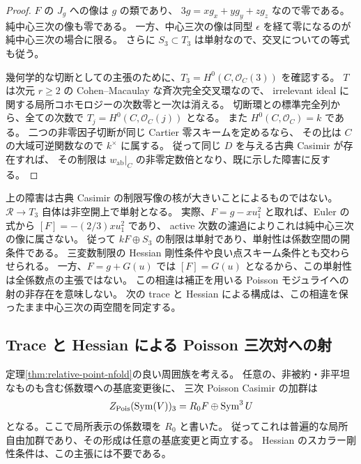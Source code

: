 \begin{proof}
$F$ の $J_g$ への像は $g$ の類であり、
$3g=xg_x+yg_y+zg_z$ なので零である。
純中心三次の像も零である。
一方、中心三次の像は同型 $\epsilon$ を経て零になるのが純中心三次の場合に限る。
さらに $S_3\subset T_3$ は単射なので、交叉についての等式も従う。

幾何学的な切断としての主張のために、$T_3=H^0(C,\mathcal O_C(3))$ を確認する。
$T$ は次元 $r\ge2$ の Cohen--Macaulay な斉次完全交叉環なので、
irrelevant ideal に関する局所コホモロジーの次数零と一次は消える。
切断環との標準完全列から、全ての次数で $T_j=H^0(C,\mathcal O_C(j))$ となる。
また $H^0(C,\mathcal O_C)=k$ である。
二つの非零因子切断が同じ Cartier 零スキームを定めるなら、
その比は $C$ の大域可逆関数なので $k^\times$ に属する。
従って同じ $D$ を与える古典 Casimir が存在すれば、
その制限は $w_{\mathrm{ab}}|_C$ の非零定数倍となり、既に示した障害に反する。
\end{proof}

\begin{remark}[古典制限写像そのものの一般単射性]
上の障害は古典 Casimir の制限写像の核が大きいことによるものではない。
$\mathcal R\to T_3$ 自体は非空開上で単射となる。
実際、$F=g-xu_1^2$ と取れば、Euler の式から $[F]=-(2/3)xu_1^2$ であり、
active 次数の濾過によりこれは純中心三次の像に属さない。
従って $kF\oplus S_3$ の制限は単射であり、単射性は係数空間の開条件である。
三変数制限の Hessian 剛性条件や良い点スキーム条件とも交わらせられる。
一方、$F=g+G(u)$ では $[F]=G(u)$ となるから、この単射性は全係数点の主張ではない。
この相違は補正を用いる Poisson モジュライへの射の非存在を意味しない。
次の trace と Hessian による構成は、この相違を保ったまま中心三次の両空間を同定する。
\end{remark}

\subsection{Trace と Hessian による Poisson 三次対への射}

\begin{lemma}\label{lem:point-relative-casimirs}
定理\ref{thm:relative-point-nfold}の良い周囲族を考える。
任意の、非被約・非平坦なものも含む係数環への基底変更後に、
三次 Poisson Casimir の加群は
\[
 Z_{\mathrm{Pois}}(\operatorname{Sym}(V))_3=R_0F\oplus\operatorname{Sym}^3U
\]
となる。ここで局所表示の係数環を $R_0$ と書いた。
従ってこれは普遍的な局所自由加群であり、その形成は任意の基底変更と両立する。
Hessian のスカラー剛性条件は、この主張には不要である。
\end{lemma}

